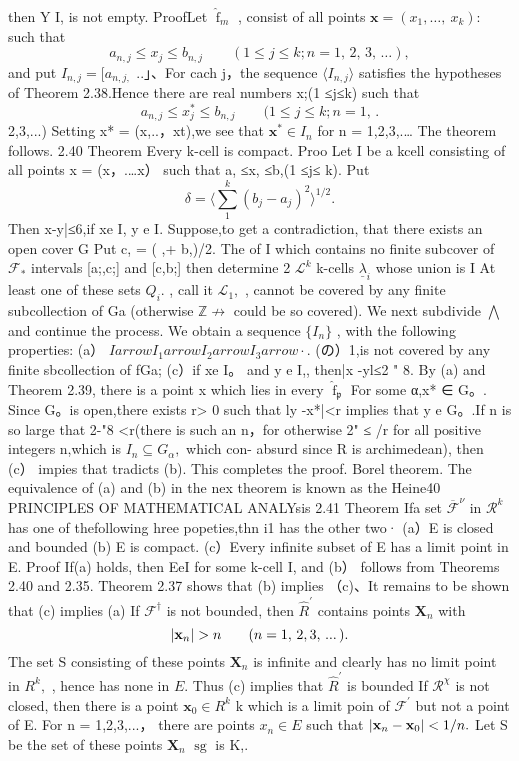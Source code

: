 then Y I, is not empty. ProofLet ${\widehat{\operatorname{f}}}_{m}$ , consist of all points $\mathbf{x}=\left(x_{1},\ldots,\ x_{k}\right)\mathbf{:}$ such that $$ a_{n,j}\leq x_{j}\leq b_{n,j}\qquad(1\leq j\leq k;n=1,\,2,\,3,\,\ldots), $$ and put $I_{n,j}=[a_{n,j,}$ ..」、For cach j，the sequence $\langle{I_{n,j}}\rangle$ satisfies the hypotheses of Theorem 2.38.Hence there are real numbers x;(1 ≤j≤k) such that $$ a_{n,j}\leq x_{j}^{*}\leq b_{n,j}\qquad(1\leq j\leq k;n=1,\,. $$ 2,3,...) Setting x* = (x,..，xt),we see that $\mathbf{x}^{\ast}\in I_{n}$ for n = 1,2,3,.… The theorem follows. 2.40 Theorem Every k-cell is compact. Proo Let I be a kcell consisting of all points x = (x，.…x） such that a, ≤x, ≤b,(1 ≤j≤ k). Put $$ \delta= \langle\sum_{1}^{k}\left(b_{j}-a_{j}\right)^{2} \rangle^{1/2}. $$ Then x-y|≤6,if xe I, y e I. Suppose,to get a contradiction, that there exists an open cover {G Put c, = ( ,+ b,)/2. The of I which contains no finite subcover of ${\mathcal{F}}_{*}$ intervals [a;,c;] and [c,b;] then determine 2 ${\mathcal{L}}^{k}$ k-cells $\textstyle{\underline{{\lambda}}}_{i}$ whose union is I At least one of these sets $Q_{i}.$ , call it ${\mathcal{L}}_{1},$ , cannot be covered by any finite subcollection of {Ga} (otherwise $\mathbb{Z}\not\to$ could be so covered). We next subdivide $\bigwedge$ and continue the process. We obtain a sequence $\{I_{n}\}$ ,} with the following properties: (a） $I arrow I_{1} arrow I_{2} arrow I_{3} arrow\cdot.$ (の）1,is not covered by any finite sbcollection of {fGa}; (c）if xe I。 and y e I,, then|x -yl≤2 " 8. By (a) and Theorem 2.39, there is a point x which lies in every ${\widehat{\operatorname{f}}}_{\mathfrak{p}}$ For some α,x* ∈ G。. Since G。is open,there exists r> 0 such that ly -x*|<r implies that y e G。.If n is so large that 2-"8 <r(there is such an n，for otherwise 2" ≤ /r for all positive integers n,which is $I_{n}\subseteq G_{\alpha},$ which con- absurd since R is archimedean), then (c） impies that tradicts (b). This completes the proof. Borel theorem. The equivalence of (a) and (b) in the nex theorem is known as the Heine40 PRINCIPLES OF MATHEMATICAL ANALYsis 2.41 Theorem Ifa set ${\overline{{\mathcal{F}}}}^{\nu}$ in $\textstyle{\mathcal{R}}^{k}$ has one of thefollowing hree popeties,thn i1 has the other two· (a）E is closed and bounded (b) E is compact. (c）Every infinite subset of E has a limit point in E. Proof If(a) holds, then EeI for some k-cell I, and (b） follows from Theorems 2.40 and 2.35. Theorem 2.37 shows that (b) implies （c)、It remains to be shown that (c) implies (a) If ${\mathcal{F}}^{\dagger}$ is not bounded, then ${\widehat{R}}^{\prime}$ contains points $\mathbf{X}_{n}$ with $$ |{\bf x}_{n}|>n\;\;\;\;\;\;\;(n=1,\,2,3,\,...\,). $$ The set S consisting of these points $\mathbf{X}_{n}$ is infinite and clearly has no limit point in $R^{k},$ , hence has none in $\textstyle E.$ Thus (c) implies that ${\widehat{R}}^{\prime}$ is bounded If ${\mathcal{R}}^{\chi}$ is not closed, then there is a point $\mathbf{x}_{0}\in R^{k}$ k which is a limit poin of ${\mathcal{F}}^{\prime}$ but not a point of E. For n = 1,2,3,...， there are points $x_{n}\in E$ such that $|{\bf x}_{n}-{\bf x}_{0}|<1/n.$ Let S be the set of these points $\mathbf{X}_{n}$ $\operatorname{sg}$ is K,. 